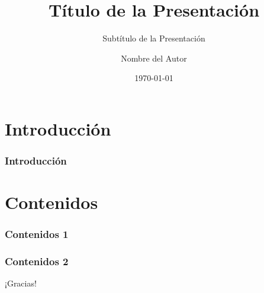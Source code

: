 \documentclass[aspectratio=169]{beamer}
\title{Título de la Presentación}
\subtitle{Subtítulo de la Presentación}
\author{Nombre del Autor}
\institute{UNAD}
\date{\today}
\begin{document}
{%
	\frame{\titlepage}
}


\section{Introducción}
\begin{frame}[t]\frametitle{Introducción}

\end{frame}

\section{Contenidos}
\begin{frame}[t]\frametitle{Contenidos 1}

\end{frame}

\begin{frame}[t]\frametitle{Contenidos 2}

\end{frame}

{%
	\begin{frame}
		¡Gracias!
	\end{frame}
	
}
\end{document}
